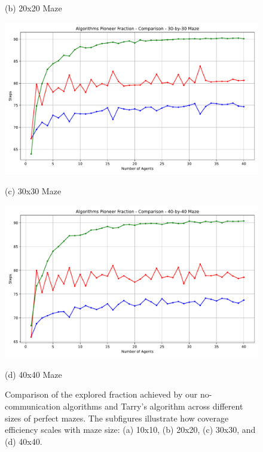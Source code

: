 \begin{figure}[H]
\begin{minipage}[b]{0.45\textwidth}
        \caption{(b) 20x20 Maze}
        \label{fig_no_comm_fraction_20x20_maze}
    \end{minipage}
    \vspace{1em}
    \begin{minipage}[b]{0.45\textwidth}
        \centering
        \includegraphics[width=\textwidth]{Cap3/no_comm_fraction__30_by_30_maze.pdf}
        \caption{(c) 30x30 Maze}
        \label{fig_no_comm_fraction_30x30_maze}
    \end{minipage}
    \hfill
    \begin{minipage}[b]{0.45\textwidth}
        \centering
        \includegraphics[width=\textwidth]{Cap3/no_comm_fraction__40_by_40_maze.pdf}
        \caption{(d) 40x40 Maze}
        \label{fig_no_comm_fraction_40x40_maze}
    \end{minipage}
    \caption{Comparison of the explored fraction achieved by our no-communication algorithms and Tarry's algorithm across different sizes of perfect mazes. The subfigures illustrate how coverage efficiency scales with maze size: (a) 10x10, (b) 20x20, (c) 30x30, and (d) 40x40.}
    \label{fig_no_comm_fraction_all_sizes_maze}
\end{figure}


